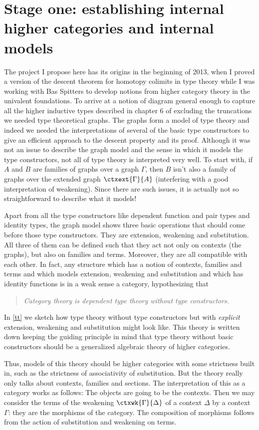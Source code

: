 \section{Stage one: establishing internal higher categories and internal models}\label{stage1}
The project I propose here has its origins in the beginning of 2013, when I proved a version
of the descent theorem for homotopy colimits in type theory while I was working
with Bas Spitters to develop notions from higher category theory in the
univalent foundations. To arrive at a
notion of diagram general enough to capture all the higher inductive types described
in chapter 6 of \cite{TheBook} excluding the truncations we needed type
theoretical graphs. The graphs form a model of type theory and indeed we needed
the interpretations of several of the basic type constructors to give an efficient approach
to the descent property and its proof. Although it was not an issue to describe the graph model
and the sense in which it models the type constructors, 
not all of type theory is interpreted very well. To start with, if $A$ and $B$ 
are families of graphs over a graph $\Gamma$, then $B$ isn't also a family of 
graphs over the extended graph $\ctxext{\Gamma}{A}$ (interfering with a good 
interpretation of weakening). Since there are such issues, it is actually
not so straightforward to describe what it models!

Apart from all the type constructors like dependent function and pair types and
identity types, the graph model shows three basic operations that should come
before those type constructors. They are extension, weakening and substitution.
All three of them can be defined such that they act not only on contexts (the graphs), 
but also on families and terms. Moreover, they are all compatible with each 
other. In fact, any structure which has a notion of contexts, families and terms
and which models extension, weakening and substitution and which has identity
functions is in a weak sense a category, hypothesizing that
\begin{quote}
\emph{Category theory is dependent type theory without type constructors.}
\end{quote}
In \autoref{tt} we sketch how type theory without type constructors but with
\emph{explicit} extension, weakening and substitution might look like. This
theory is written down keeping the guiding principle in mind that type theory
without basic constructors should be a generalized algebraic theory of higher
categories.

Thus, models of this theory should be higher categories with some strictness
built in, such as the strictness of associativity of substitution. But the
theory really only talks about contexts, families and sections. The interpretation
of this as a category works as follows: The objects are going to be the contexts.
Then we may consider the terms of the weakening $\ctxwk{\Gamma}{\Delta}$ of a
context $\Delta$ by a context $\Gamma$: they are the morphisms of the category.
The composition of morphisms follows from the action of substitution and
weakening on terms. 

